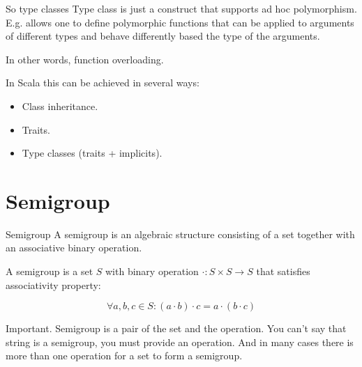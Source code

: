 \documentclass[presentation,aspectratio=169,smaller]{beamer}
\begin{document}
\begin{frame}[label={sec:orgd7e5996}]{So type classes}
Type class is just a construct that supports ad hoc polymorphism. E.g. allows
one to define polymorphic functions that can be applied to arguments of
different types and behave differently based the type of the arguments.

In other words, function overloading.

In Scala this can be achieved in several ways:

\begin{itemize}
\item Class inheritance.
\item Traits.
\item Type classes (traits + implicits).
\end{itemize}
\end{frame}

\section*{Semigroup}
\label{sec:org80e393a}

\begin{frame}[label={sec:orgec2e24e}]{Semigroup}
A semigroup is an algebraic structure consisting of a set together with an
associative binary operation.

\pause

A semigroup is a set \(S\) with binary operation \(\cdot : S \times S \rightarrow
S\) that satisfies associativity property:

$$\forall a, b, c \in S : (a \cdot b) \cdot c = a \cdot (b \cdot c)$$

\pause

\alert{Important}. Semigroup is a pair of the set and the operation. You can’t say
 that string is a semigroup, you must provide an operation. And in many cases
 there is more than one operation for a set to form a semigroup.
\end{frame}
\end{document}
